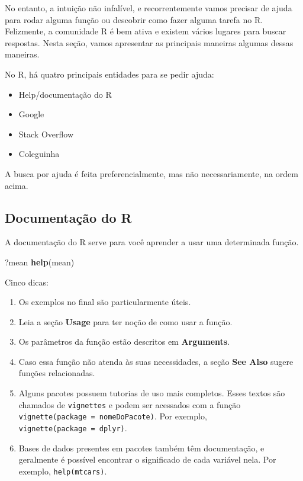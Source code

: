 \documentclass[
]{book}
\newenvironment{Shaded}{\begin{snugshade}}{\end{snugshade}}
\newcommand{\KeywordTok}[1]{\textcolor[rgb]{0.13,0.29,0.53}{\textbf{#1}}}
\newcommand{\NormalTok}[1]{#1}
\providecommand{\tightlist}{%
  \setlength{\itemsep}{0pt}\setlength{\parskip}{0pt}}
\begin{document}
No entanto, a intuição não infalível, e recorrentemente vamos precisar de ajuda para rodar alguma função ou descobrir como fazer alguma tarefa no R. Felizmente, a comunidade R é bem ativa e existem vários lugares para buscar respostas. Nesta seção, vamos apresentar as principais maneiras algumas dessas maneiras.

No R, há quatro principais entidades para se pedir ajuda:

\begin{itemize}
\tightlist
\item
  Help/documentação do R
\item
  Google
\item
  Stack Overflow
\item
  Coleguinha
\end{itemize}

A busca por ajuda é feita preferencialmente, mas não necessariamente, na ordem acima.

\hypertarget{documentauxe7uxe3o-do-r}{%
\subsection{Documentação do R}\label{documentauxe7uxe3o-do-r}}

A documentação do R serve para você aprender a usar uma determinada função.

\begin{Shaded}
\begin{Highlighting}[]
\NormalTok{?mean}
\KeywordTok{help}\NormalTok{(mean)}
\end{Highlighting}
\end{Shaded}

Cinco dicas:

\begin{enumerate}
\def\labelenumi{\arabic{enumi}.}
\tightlist
\item
  Os exemplos no final são particularmente úteis.
\item
  Leia a seção \textbf{Usage} para ter noção de como usar a função.
\item
  Os parâmetros da função estão descritos em \textbf{Arguments}.
\item
  Caso essa função não atenda às suas necessidades, a seção \textbf{See Also} sugere funções relacionadas.
\item
  Alguns pacotes possuem tutorias de uso mais completos. Esses textos são chamados de \texttt{vignettes} e podem ser acessados com a função \texttt{vignette(package\ =\ \textquotesingle{}nomeDoPacote\textquotesingle{})}. Por exemplo, \texttt{vignette(package\ =\ \textquotesingle{}dplyr\textquotesingle{})}.
\item
  Bases de dados presentes em pacotes também têm documentação, e geralmente é possível encontrar o significado de cada variável nela. Por exemplo, \texttt{help(mtcars)}.
\end{enumerate}
\end{document}
